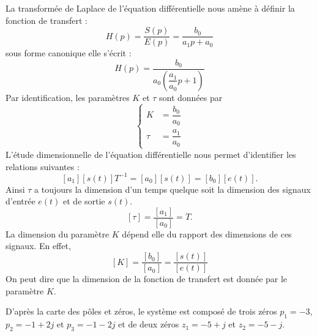 \question{}
La transformée de Laplace de l'équation différentielle nous amène à définir
la fonction de transfert :
\[
    H(p)= \dfrac{S(p)}{E(p)}=\dfrac{b_0}{a_1p+a_0}
\]
sous forme canonique elle s'écrit :
\[
    H(p)=\dfrac{b_0}{a_0\left(\dfrac{a_1}{a_0}p+1\right)}
\]
\question{}
Par identification, les paramètres $K$ et $\tau$ sont données par 
\[
    \begin{cases}
        K&=\dfrac{b_0}{a_0}\\[1.5em]
     \tau&=\dfrac{a_1}{a_0}
    \end{cases}
\]
\question{}
L'étude dimensionnelle de l'équation différentielle nous permet d'identifier
les relations suivantes :
\[
    [a_1][s(t)] T^{-1} = [a_0][s(t)] = [b_0][e(t)].
\]
Ainsi $\tau$ a toujours la dimension d'un temps quelque soit la dimension des 
signaux d'entrée  $e(t)$ et de sortie $s(t)$.
\[
    [\tau] = \dfrac{[a_1]}{[a_0]}= T.
\]
La dimension du paramètre $K$ dépend elle du rapport des dimensions de ces 
signaux. En effet,
\[
    [K]=\dfrac{[b_0]}{[a_0]}=\dfrac{[s(t)]}{[e(t)]}
\]
On peut dire que la dimension de la fonction de transfert est donnée par 
le paramètre $K$.
 

\question{}
D'après la carte des pôles et zéros, le système est composé de trois zéros
$p_1=-3$, $p_2=-1+2j$ et $p_3=-1-2j$ et de deux zéros $z_1=-5+j$ et $z_2=-5-j$.

